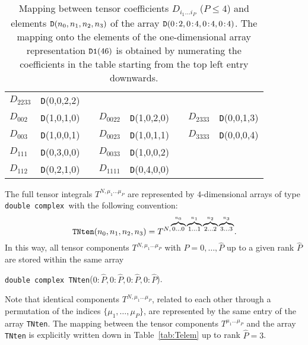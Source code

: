 \documentclass[preprint,sort&compress,12pt]{elsarticle}
\def\beq{\begin{equation}}
\def\eeq{\end{equation}}
\def\refta#1{\mbox{Table~\ref{#1}}}
\newcommand{\sst}{\scriptstyle}
\begin{document}
\begin{table}
\begin{center}
\begin{tabular}{l|lcl|lcl|l}
                               $D_{2233}$ & {\tt D}(0,0,2,2) \\  
$D_{002}$  & {\tt D}(1,0,1,0)   &\phantom{space}& $D_{0022}$ & {\tt D}(1,0,2,0) &\phantom{space}& 
                               $D_{2333}$ & {\tt D}(0,0,1,3) \\  
$D_{003}$  & {\tt D}(1,0,0,1)   &\phantom{space}& $D_{0023}$ & {\tt D}(1,0,1,1) &\phantom{space}& 
                               $D_{3333}$ & {\tt D}(0,0,0,4) \\  
$D_{111}$  & {\tt D}(0,3,0,0)   &\phantom{space}& $D_{0033}$ & {\tt D}(1,0,0,2) &\phantom{space}& 
                               & \\  
$D_{112}$  & {\tt D}(0,2,1,0)   &\phantom{space}& $D_{1111}$ & {\tt D}(0,4,0,0) &\phantom{space}& 
                               &  \\  
   \end{tabular}
\end{center}
  \caption{Mapping between tensor coefficients $D_{i_1\ldots i_P}$ ($P\le 4$) and elements 
${\tt D}(n_0,n_1,n_2,n_3)$ of the array ${\tt D}(0\!:\!2,0\!:\!4,0\!:\!4,0\!:\!4)$. The mapping onto 
the elements of the one-dimensional array representation ${\tt D1}(46)$ is obtained by 
numerating the coefficients in the table starting from the top left entry downwards.   
       }
  \label{tab:Dcoefs}
\end{table}

The full tensor integrals $T^{N,\mu_1\ldots\mu_P}$ are represented by
$4$-dimensional arrays of type {\tt double complex }with the following
convention:
\beq
{\tt TNten}(n_0,n_1,n_2,n_3)=
 T^{N,\overbrace{\sst 0\ldots0}^{n_0}
\overbrace{\sst 1\ldots1}^{n_1}
\overbrace{\sst 2\ldots2}^{n_2}
\overbrace{\sst 3\ldots3}^{n_3}}.
\eeq
In this way, all tensor components $T^{N,\mu_1\ldots \mu_P}$ with
$P=0,\ldots,\widehat{P}$ up to a given rank $\widehat{P}$ are stored
within the same array
\begin{center}
  {\tt double complex TNten}($0\!:\!\widehat{P},0\!:\!\widehat{P},0\!:\!\widehat{P},
                              0\!:\!\widehat{P}$). 
\end{center}
Note that identical components
$T^{N,\mu_1\ldots \mu_P}$, related to
each other through a permutation of the indices $\{\mu_1,\ldots,\mu_P\}$,
are represented by the same entry of the array {\tt TNten}.  The
mapping between the tensor components $T^{\mu_1\ldots \mu_P}$ and the
array {\tt TNten} is explicitly written down in \refta{tab:Telem} up
to rank $\widehat{P}=3$.
\end{document}

